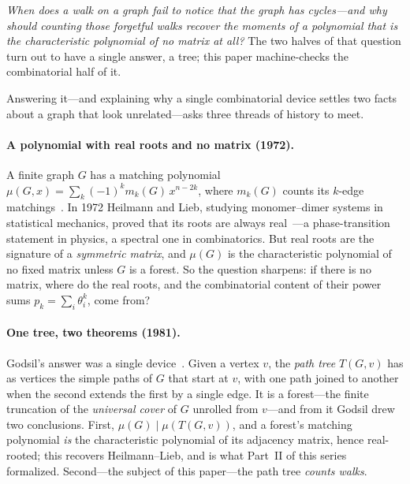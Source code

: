 \documentclass[11pt]{article}
\begin{document}
\emph{When does a walk on a graph fail to notice that the graph has cycles---and why should counting
those forgetful walks recover the moments of a polynomial that is the characteristic polynomial of no
matrix at all?} The two halves of that question turn out to have a single answer, a tree; this paper
machine-checks the combinatorial half of it.

Answering it---and explaining why a single combinatorial device settles two facts about a graph that
look unrelated---asks three threads of history to meet.

\paragraph{A polynomial with real roots and no matrix (1972).} A finite graph $G$ has a matching
polynomial $\mu(G,x)=\sum_{k}(-1)^k m_k(G)\,x^{n-2k}$, where $m_k(G)$ counts its $k$-edge
matchings~\cite{Farrell1979,LovaszPlummer}. In 1972 Heilmann and Lieb, studying monomer--dimer
systems in statistical mechanics, proved that its roots are always real~\cite{HeilmannLieb}---a
phase-transition statement in physics, a spectral one in combinatorics. But real roots are the
signature of a \emph{symmetric matrix}, and $\mu(G)$ is the characteristic polynomial of no fixed
matrix unless $G$ is a forest. So the question sharpens: if there is no matrix, where do the real
roots, and the combinatorial content of their power sums $p_k=\sum_i\theta_i^{k}$, come from?

\paragraph{One tree, two theorems (1981).} Godsil's answer was a single device~\cite{Godsil1981a,
Godsil1981b,GodsilBook}. Given a vertex $v$, the \emph{path tree} $T(G,v)$ has as vertices the simple
paths of $G$ that start at $v$, with one path joined to another when the second extends the first by a
single edge. It is a forest---the finite truncation of the \emph{universal cover} of $G$ unrolled from
$v$---and from it Godsil drew two conclusions. First, $\mu(G)\mid\mu(T(G,v))$, and a forest's matching
polynomial \emph{is} the characteristic polynomial of its adjacency matrix, hence real-rooted; this
recovers Heilmann--Lieb, and is what Part~II of this series~\cite{PartII} formalized. Second---the
subject of this paper---the path tree \emph{counts walks}.
\end{document}
